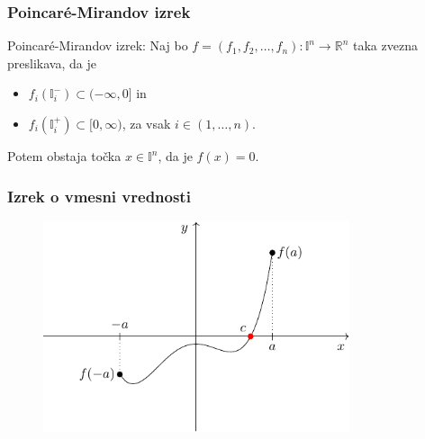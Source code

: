 \documentclass[t]{beamer} %
\begin{document}
\begin{frame}
\begin{figure}[h!]
\end{figure}
\end{frame}



\begin{frame}
\frametitle{Poincar\'{e}-Mirandov izrek}
\begin{block}{Poincar\'{e}-Mirandov izrek:}
Naj bo $f = (f_1, f_2, \dots, f_n) : \mathbb{I}^n \rightarrow \mathbb{R}^n$ taka zvezna preslikava, da je 
\begin{itemize}
\item $f_i (\mathbb{I}_i ^-) \subset (-\infty, 0]$ in
\item $f_i (\mathbb{I}_i ^+) \subset [0, \infty)$, za vsak $i \in (1, \dots, n)$.
\end{itemize}
Potem obstaja točka $x\in \mathbb{I}^n$, da je $f(x) = 0$.
\end{block}
\end{frame}

\begin{frame}
\frametitle{Izrek o vmesni vrednosti}

\begin{figure}
\includegraphics[width=9cm]{bolzano.pdf}
\end{figure}
\end{frame}
\end{document}
